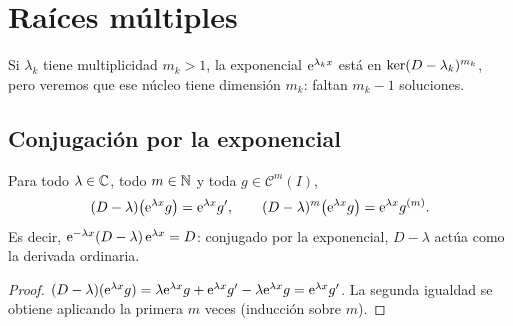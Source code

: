 \section{Raíces múltiples}\label{sec:multiples}

Si $\lambda_k$ tiene multiplicidad $m_k>1$, la exponencial $\mathrm{e}^{\lambda_kx}$
está en $\operatorname{ker}(D-\lambda_k)^{m_k}$, pero veremos que ese núcleo tiene
dimensión $m_k$: faltan $m_k-1$ soluciones.

\subsection{Conjugación por la exponencial}\label{sec:conjugacion}

\begin{lema}\label{lem:covariante}
Para todo $\lambda\in\mathbb{C}$, todo $m\in\mathbb{N}$ y toda $g\in\mathcal C^{m}(I)$,
\begin{equation}\label{eq:covariante}
  (D-\lambda)\bigl(\mathrm{e}^{\lambda x}g\bigr)=\mathrm{e}^{\lambda x}g',
  \qquad
  (D-\lambda)^{m}\bigl(\mathrm{e}^{\lambda x}g\bigr)=\mathrm{e}^{\lambda x}g^{(m)} .
\end{equation}
Es decir, $\mathrm{e}^{-\lambda x}(D-\lambda)\,\mathrm{e}^{\lambda x}=D$: conjugado por la
exponencial, $D-\lambda$ actúa como la derivada ordinaria.
\end{lema}

\begin{proof}
$(D-\lambda)(\mathrm{e}^{\lambda x}g)=\lambda\mathrm{e}^{\lambda x}g+\mathrm{e}^{\lambda x}g'-\lambda\mathrm{e}^{\lambda x}g=\mathrm{e}^{\lambda x}g'$.
La segunda igualdad se obtiene aplicando la primera $m$ veces (inducción
sobre $m$).
\end{proof}

